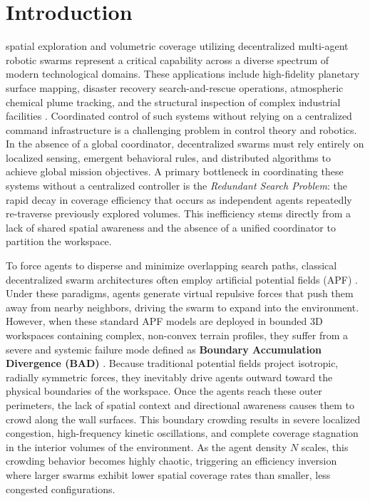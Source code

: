 \documentclass[letterpaper, 10pt, conference]{IEEEtran}
\begin{document}
\section{Introduction}
\label{sec:intro}

 spatial exploration and volumetric coverage utilizing decentralized multi-agent robotic swarms represent a critical capability across a diverse spectrum of modern technological domains. These applications include high-fidelity planetary surface mapping, disaster recovery search-and-rescue operations, atmospheric chemical plume tracking, and the structural inspection of complex industrial facilities \cite{latombe1991, brambilla2013review}. Coordinated control of such systems without relying on a centralized command infrastructure is a challenging problem in control theory and robotics. In the absence of a global coordinator, decentralized swarms must rely entirely on localized sensing, emergent behavioral rules, and distributed algorithms to achieve global mission objectives. A primary bottleneck in coordinating these systems without a centralized controller is the \textit{Redundant Search Problem}: the rapid decay in coverage efficiency that occurs as independent agents repeatedly re-traverse previously explored volumes. This inefficiency stems directly from a lack of shared spatial awareness and the absence of a unified coordinator to partition the workspace.

To force agents to disperse and minimize overlapping search paths, classical decentralized swarm architectures often employ artificial potential fields (APF) \cite{saska2014cooperative}. Under these paradigms, agents generate virtual repulsive forces that push them away from nearby neighbors, driving the swarm to expand into the environment. However, when these standard APF models are deployed in bounded 3D workspaces containing complex, non-convex terrain profiles, they suffer from a severe and systemic failure mode defined as \textbf{Boundary Accumulation Divergence (BAD)} \cite{saska2014cooperative}. Because traditional potential fields project isotropic, radially symmetric forces, they inevitably drive agents outward toward the physical boundaries of the workspace. Once the agents reach these outer perimeters, the lack of spatial context and directional awareness causes them to crowd along the wall surfaces. This boundary crowding results in severe localized congestion, high-frequency kinetic oscillations, and complete coverage stagnation in the interior volumes of the environment. As the agent density $N$ scales, this crowding behavior becomes highly chaotic, triggering an efficiency inversion where larger swarms exhibit lower spatial coverage rates than smaller, less congested configurations.
\end{document}
